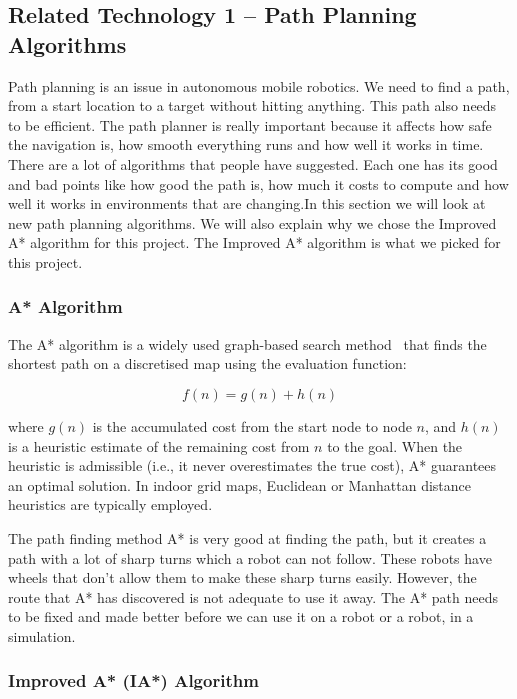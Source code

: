 \subsection{Related Technology 1 -- Path Planning Algorithms}
Path planning is an issue in autonomous mobile robotics. We need to find a path, from a start location to a target without hitting anything. This path also needs to be efficient. The path planner is really important because it affects how safe the navigation is, how smooth everything runs and how well it works in time. There are a lot of algorithms that people have suggested. Each one has its good and bad points like how good the path is, how much it costs to compute and how well it works in environments that are changing.In this section we will look at new path planning algorithms. We will also explain why we chose the Improved A* algorithm for this project. The Improved A* algorithm is what we picked for this project.

\subsubsection{A* Algorithm}

The A* algorithm is a widely used graph-based search method~ that finds the shortest path on a discretised map using the evaluation function:

\begin{equation}
f(n) = g(n) + h(n)
\end{equation}

where $g(n)$ is the accumulated cost from the start node to node $n$, and $h(n)$ is a heuristic estimate of the remaining cost from $n$ to the goal. When the heuristic is admissible (i.e., it never overestimates the true cost), A* guarantees an optimal solution. In indoor grid maps, Euclidean or Manhattan distance heuristics are typically employed\cite{zhang2022improved}.

The path finding method A* is very good at finding the path, but it creates a path with a lot of sharp turns which a robot can not follow. These robots have wheels that don't allow them to make these sharp turns easily. However, the route that A* has discovered is not adequate to use it away. The A* path needs to be fixed and made better before we can use it on a robot or a robot, in a simulation.

\subsubsection{Improved A* (IA*) Algorithm}

